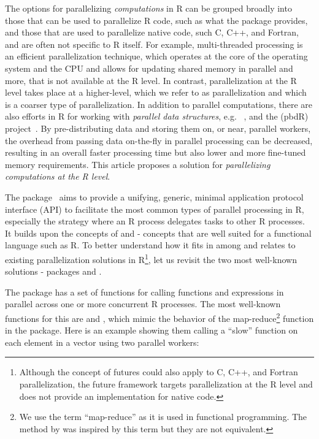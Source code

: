 The options for parallelizing \emph{computations} in R can be grouped
broadly into those that can be used to parallelize R code, such as
what the  package provides, and those that are used to
parallelize native code, such C, C++, and Fortran, and are often not
specific to R itself.  For example, multi-threaded processing is an
efficient parallelization technique, which operates at the core of the
operating system and the CPU and allows for updating shared memory in
parallel and more, that is not available at the R level.  In contrast,
parallelization at the R level takes place at a higher-level, which we
refer to as  parallelization and which is a coarser
type of parallelization.
%
In addition to parallel computations, there are also efforts in R for
working with \emph{parallel data structures}, e.g.
~\citep{CRAN:sparklyr}, and the
 (pbdR) project~\citep{Schmidt2017}.
By pre-distributing data and storing them on, or near, parallel
workers, the overhead from passing data on-the-fly in parallel
processing can be decreased, resulting in an overall faster processing
time but also lower and more fine-tuned memory requirements.
%
This article proposes a solution for \emph{parallelizing computations
at the R level}.

The  package~\citep{CRAN:future} aims to provide a
unifying, generic, minimal application protocol interface (API) to
facilitate the most common types of parallel processing in R,
especially the  strategy where an R process
delegates tasks to other R processes. It builds upon the concepts
of  \citep{HewittBaker_1977}
and  \citep{FriedmanWise_1978, Hibbard_1976} - concepts
that are well suited for a functional language such as R.
To better understand how it fits in among and relates to existing
parallelization solutions in R\footnote{Although the concept of
futures could also apply to C, C++, and Fortran parallelization, the
future framework targets parallelization at the R level and does not
provide an implementation for native code.}, let us revisit the two
most well-known solutions - packages 
and .

The  package has a set of functions for calling
functions and expressions in parallel across one or more concurrent R
processes. The most well-known functions for this
are  and , which mimic the behavior
of the map-reduce\footnote{We use the term ``map-reduce'' as it is
used in functional programming. The  method by
\citet{DeanGhemawat2004} was inspired by this term but they are not
equivalent.}
function  in the  package.  Here is an
example showing them calling a ``slow'' function on each element in a
vector using two parallel workers:

